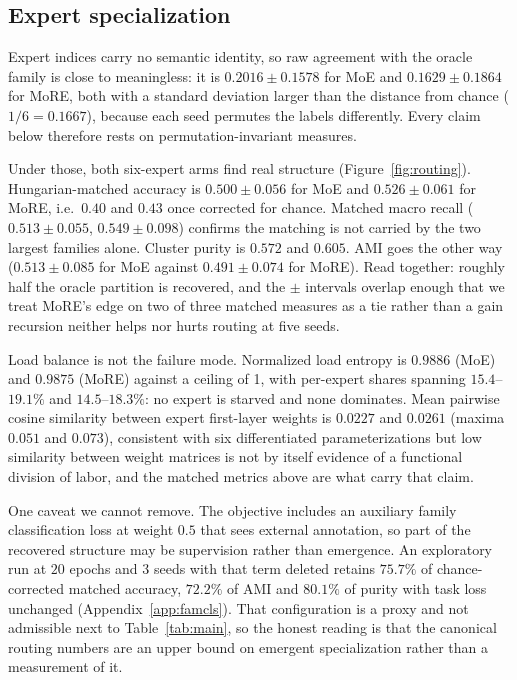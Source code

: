 \documentclass{article}
\begin{document}
\subsection{Expert specialization}
\label{sec:routing}

Expert indices carry no semantic identity, so raw agreement with the oracle
family is close to meaningless: it is $0.2016 \pm 0.1578$ for MoE and
$0.1629 \pm 0.1864$ for MoRE, both with a standard deviation larger than the
distance from chance ($1/6 = 0.1667$), because each seed permutes the labels
differently. Every claim below therefore rests on permutation-invariant
measures.

Under those, both six-expert arms find real structure
(Figure~\ref{fig:routing}). Hungarian-matched
accuracy is $0.500 \pm 0.056$ for MoE and $0.526 \pm 0.061$ for MoRE, i.e.\
$0.40$ and $0.43$ once corrected for chance. Matched macro recall
($0.513 \pm 0.055$, $0.549 \pm 0.098$) confirms the matching is not carried by
the two largest families alone. Cluster purity is $0.572$ and $0.605$. AMI goes
the other way ($0.513 \pm 0.085$ for MoE against $0.491 \pm 0.074$ for MoRE).
Read together:
roughly half the oracle partition is recovered, and the $\pm$ intervals overlap
enough that we treat MoRE's edge on two of three matched measures as a tie
rather than a gain  recursion neither helps nor hurts routing at five seeds.

Load balance is not the failure mode. Normalized load entropy is $0.9886$ (MoE)
and $0.9875$ (MoRE) against a ceiling of 1, with per-expert shares spanning
$15.4$--$19.1\%$ and $14.5$--$18.3\%$: no expert is starved and none dominates.
Mean pairwise cosine similarity between expert first-layer weights is $0.0227$
and $0.0261$ (maxima $0.051$ and $0.073$), consistent with six differentiated
parameterizations  but low similarity between weight matrices is not by itself
evidence of a functional division of labor, and the matched metrics above are
what carry that claim.

One caveat we cannot remove. The objective includes an auxiliary family
classification loss at weight $0.5$ that sees external annotation, so part of
the recovered structure may be supervision rather than emergence. An exploratory
run at $20$ epochs and $3$ seeds with that term deleted retains $75.7\%$ of
chance-corrected matched accuracy, $72.2\%$ of AMI and $80.1\%$ of purity with
task loss unchanged (Appendix~\ref{app:famcls}). That configuration is a proxy
and not admissible next to Table~\ref{tab:main}, so the honest reading is that
the canonical routing numbers are an upper bound on emergent specialization
rather than a measurement of it.
\end{document}
